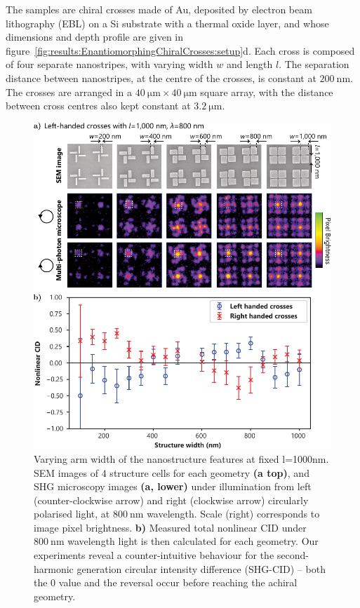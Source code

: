 The samples are chiral crosses made of Au, deposited by electron beam lithography (EBL) on a Si substrate with a thermal oxide layer, and whose dimensions and depth profile are given in figure~\ref{fig:results:EnantiomorphingChiralCrosses:setup}d. Each cross is composed of four separate nanostripes, with varying width $w$ and length $l$. The separation distance between nanostripes, at the centre of the crosses, is constant at $\SI{200}{\nano\m}$. The crosses are arranged in a $\SI{40}{\micro\m} \times \SI{40}{\micro\m}$ square array, with the distance between cross centres also kept constant at $\SI{3.2}{\micro\m}$. 

\begin{figure}[htb!]	
    \centering	
    \includegraphics[scale=1]{./figures/results/EnantiomorphingChiralCrosses/l1000data.pdf}
    \caption{\label{fig:results:EnantiomorphingChiralCrosses:l1000data}
    Varying arm width of the nanostructure features at fixed l=1000nm. SEM images of 4 structure cells for each geometry \textbf{(a top)}, and SHG microscopy images \textbf{(a, lower)} under illumination from left (counter-clockwise arrow) and right (clockwise arrow) circularly polarised light, at $\SI{800}{\nano\m}$ wavelength. Scale (right) corresponds to image pixel brightness. \textbf{b)} Measured total nonlinear CID under $\SI{800}{\nano\m}$ wavelength light is then calculated for each geometry. Our experiments reveal a counter-intuitive behaviour for the second-harmonic generation circular intensity difference (SHG-CID) – both the 0 value and the reversal occur before reaching the achiral geometry.}	
\end{figure}


